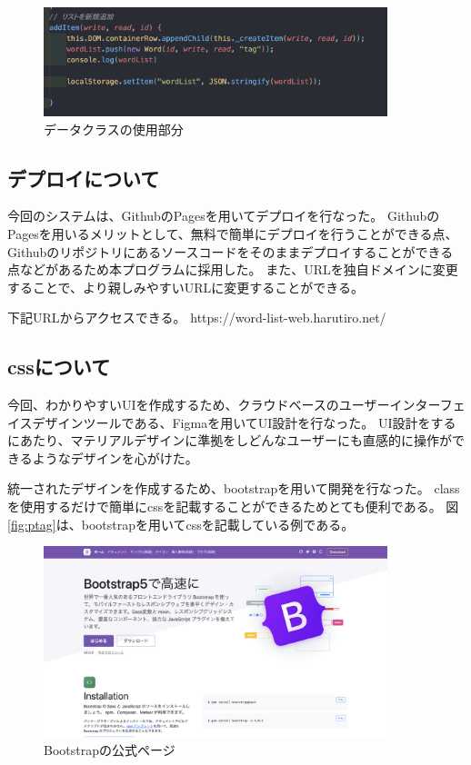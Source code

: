 \documentclass[11pt,a4paper]{jsarticle}
\begin{document}
\begin{figure}[htbp]
    \begin{center}
        \includegraphics[width=100mm]{./img/new_word.png}
    \end{center}
    \caption{データクラスの使用部分}
    \label{fig:new_word}
\end{figure}

\subsection{デプロイについて}
今回のシステムは、GithubのPagesを用いてデプロイを行なった。
GithubのPagesを用いるメリットとして、無料で簡単にデプロイを行うことができる点、
Githubのリポジトリにあるソースコードをそのままデプロイすることができる点などがあるため本プログラムに採用した。
また、URLを独自ドメインに変更することで、より親しみやすいURLに変更することができる。

下記URLからアクセスできる。
https://word-list-web.harutiro.net/


\subsection{cssについて}
今回、わかりやすいUIを作成するため、クラウドベースのユーザーインターフェイスデザインツールである、Figmaを用いてUI設計を行なった。
UI設計をするにあたり、マテリアルデザインに準拠をしどんなユーザーにも直感的に操作ができるようなデザインを心がけた。

統一されたデザインを作成するため、bootstrapを用いて開発を行なった。
classを使用するだけで簡単にcssを記載することができるためとても便利である。
図\ref{fig:ptag}は、bootstrapを用いてcssを記載している例である。

\begin{figure}[htbp]
    \begin{center}
        \includegraphics[width=100mm]{./img/bootstrap.png}
    \end{center}
    \caption{Bootstrapの公式ページ}
\end{figure}
\end{document}
